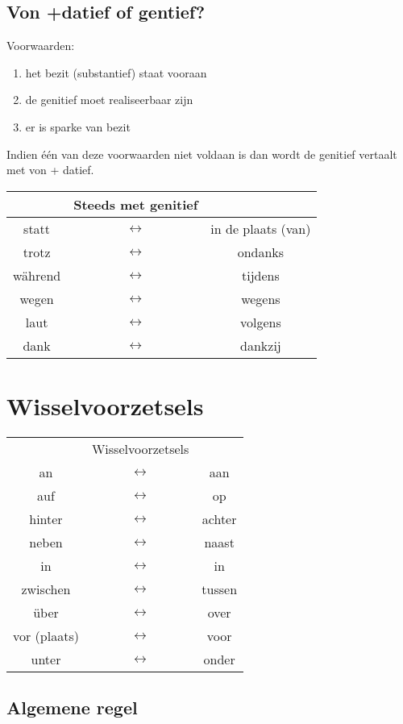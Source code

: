 \documentclass[main.tex]{subfiles}
\begin{document}
\subsection{Von +datief of gentief?}
Voorwaarden:
\begin{enumerate}
\item het bezit (substantief) staat vooraan
\item de genitief moet realiseerbaar zijn
\item er is sparke van bezit
\end{enumerate}
Indien één van deze voorwaarden niet voldaan is dan wordt de genitief vertaalt met von + datief.
\begin{tabular}{ccc}
 & Steeds met genitief &  \\ 
 \hline
statt & $\leftrightarrow$ & in de plaats (van) \\ 
trotz & $\leftrightarrow$ & ondanks \\ 
während & $\leftrightarrow$ & tijdens \\ 
wegen & $\leftrightarrow$ & wegens \\ 
laut & $\leftrightarrow$ & volgens \\ 
dank & $\leftrightarrow$ & dankzij \\ 
\end{tabular} 

\section{Wisselvoorzetsels}

\begin{tabular}{ccc}
 & Wisselvoorzetsels &  \\ 
an & $\leftrightarrow$ & aan \\ 
auf & $\leftrightarrow$ & op \\ 
hinter & $\leftrightarrow$ & achter \\ 
neben & $\leftrightarrow$ & naast \\ 
in & $\leftrightarrow$ & in \\ 
zwischen & $\leftrightarrow$ & tussen \\ 
über & $\leftrightarrow$ & over \\ 
vor (plaats) & $\leftrightarrow$ & voor \\ 
unter & $\leftrightarrow$ & onder \\ 
\end{tabular} 

\subsection{Algemene regel}
\end{document}
